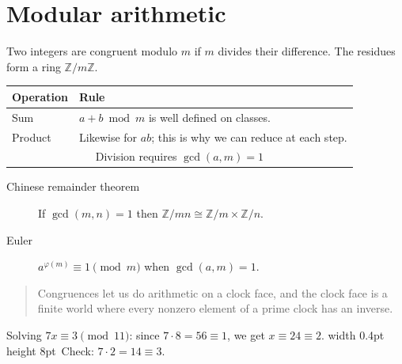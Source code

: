 \documentclass[10pt,letterpaper]{article}
\begin{document}
\pagestyle{empty}
\section{Modular arithmetic}
Two integers are congruent modulo $m$ if $m$ divides their difference. The residues form a ring $\mathbb{Z}/m\mathbb{Z}$.

\begin{tabular}[t]{|l|p{5cm}|}
\hline
Operation & Rule\\ \hline
Sum & $a+b \bmod m$ is well defined on classes.\\[4pt]
Product & Likewise for $ab$; this is why we can reduce at each step.\\ \hline
\multicolumn{2}{|c|}{Division requires $\gcd(a,m)=1$}\\ \hline
\end{tabular}

\bigskip
\begin{description}
\item[Chinese remainder theorem] If $\gcd(m,n)=1$ then $\mathbb{Z}/mn\cong\mathbb{Z}/m\times\mathbb{Z}/n$.
\item[Euler] $a^{\varphi(m)}\equiv1\pmod m$ when $\gcd(a,m)=1$.
\end{description}

\begin{quotation}
Congruences let us do arithmetic on a clock face, and the clock face is a finite world where every nonzero element of a prime clock has an inverse.
\end{quotation}

\raggedright
Solving $7x\equiv3\pmod{11}$: since $7\cdot8=56\equiv1$, we get $x\equiv24\equiv2$. \vrule width 0.4pt height 8pt\ Check: $7\cdot2=14\equiv3$.
\end{document}
